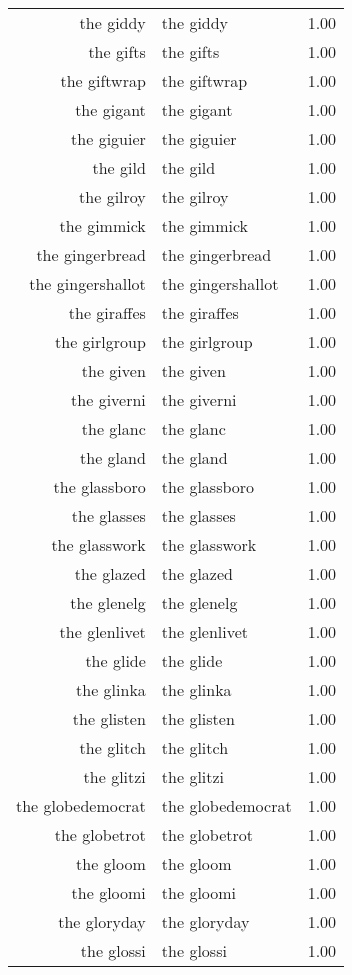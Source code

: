 \begin{table}[ht]
\begin{tabular}{rlr}
  the giddy & the giddy & 1.00 \\ 
  the gifts & the gifts & 1.00 \\ 
  the giftwrap & the giftwrap & 1.00 \\ 
  the gigant & the gigant & 1.00 \\ 
  the giguier & the giguier & 1.00 \\ 
  the gild & the gild & 1.00 \\ 
  the gilroy & the gilroy & 1.00 \\ 
  the gimmick & the gimmick & 1.00 \\ 
  the gingerbread & the gingerbread & 1.00 \\ 
  the gingershallot & the gingershallot & 1.00 \\ 
  the giraffes & the giraffes & 1.00 \\ 
  the girlgroup & the girlgroup & 1.00 \\ 
  the given & the given & 1.00 \\ 
  the giverni & the giverni & 1.00 \\ 
  the glanc & the glanc & 1.00 \\ 
  the gland & the gland & 1.00 \\ 
  the glassboro & the glassboro & 1.00 \\ 
  the glasses & the glasses & 1.00 \\ 
  the glasswork & the glasswork & 1.00 \\ 
  the glazed & the glazed & 1.00 \\ 
  the glenelg & the glenelg & 1.00 \\ 
  the glenlivet & the glenlivet & 1.00 \\ 
  the glide & the glide & 1.00 \\ 
  the glinka & the glinka & 1.00 \\ 
  the glisten & the glisten & 1.00 \\ 
  the glitch & the glitch & 1.00 \\ 
  the glitzi & the glitzi & 1.00 \\ 
  the globedemocrat & the globedemocrat & 1.00 \\ 
  the globetrot & the globetrot & 1.00 \\ 
  the gloom & the gloom & 1.00 \\ 
  the gloomi & the gloomi & 1.00 \\ 
  the gloryday & the gloryday & 1.00 \\ 
  the glossi & the glossi & 1.00 \\ 

\end{tabular}
\end{table}
